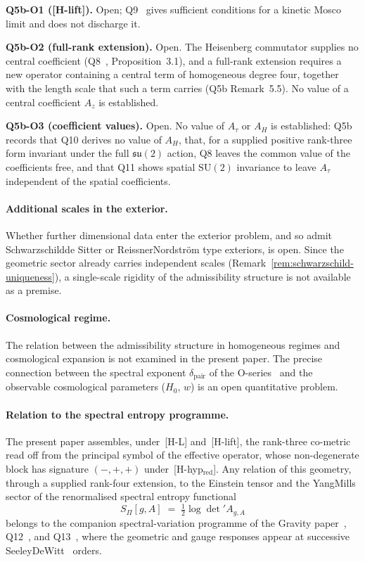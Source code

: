 \documentclass[11pt,a4paper]{article}
\begin{document}
    \textbf{Q5b-O1 ([H-lift]).}
    Open; Q9~\cite{Beau2026q9} gives sufficient conditions for a kinetic Mosco limit and does not discharge it.

    \textbf{Q5b-O2 (full-rank extension).}
    Open.
    The Heisenberg commutator supplies no central coefficient (Q8~\cite{BeauQ8}, Proposition~3.1), and a full-rank
    extension requires a new operator containing a central term of homogeneous degree four, together with the length
    scale that such a term carries (Q5b Remark~5.5).
    No value of a central coefficient $A_z$ is established.

    \textbf{Q5b-O3 (coefficient values).}
    Open.
    No value of $A_\tau$ or $A_H$ is established: Q5b~\cite{Beau2026q5b} records that Q10 derives no value of $A_H$,
    that, for a supplied positive rank-three form invariant under the full $\mathfrak{su}(2)$ action, Q8 leaves the
    common value of the coefficients free, and that Q11 shows spatial
    $\mathrm{SU}(2)$ invariance to leave $A_\tau$ independent of the spatial coefficients.

  \paragraph{Additional scales in the exterior.}
    Whether further dimensional data enter the exterior problem, and so admit Schwarzschild\textendash de Sitter or
    Reissner\textendash Nordstr\"om type exteriors, is open.
    Since the geometric sector already carries independent scales (Remark~\ref{rem:schwarzschild-uniqueness}), a
    single-scale rigidity of the admissibility structure is not available as a premise.

  \paragraph{Cosmological regime.}
    The relation between the admissibility structure in homogeneous regimes and cosmological expansion is not examined
    in the present paper.
    The precise connection between the spectral exponent $\delta_{\mathrm{pair}}$ of the O-series~\cite{Beau2026a28}
    and the observable cosmological parameters ($H_0$, $w$) is an open quantitative problem.

  \paragraph{Relation to the spectral entropy programme.}
    The present paper assembles, under~[H-L] and~[H-lift], the rank-three co-metric read off from the principal
    symbol of the effective operator, whose non-degenerate block has signature $(-,+,+)$
    under~[H-hyp$_{\mathrm{red}}$].
    Any relation of this geometry, through a supplied rank-four extension, to the Einstein tensor and the
    Yang\textendash Mills sector of the renormalised spectral entropy functional
    \[
      S_\Pi[g,A] \;=\; \tfrac{1}{2}\log\det{}' A_{g,A}
    \]
    belongs to the companion spectral-variation programme of the Gravity
    paper~\cite{Beau2026h}, Q12~\cite{Beau2026q12}, and Q13~\cite{Beau2026q13}, where the geometric and gauge
    responses appear at successive Seeley\textendash DeWitt~\cite{Seeley1967,DeWitt1965} orders.
\end{document}
